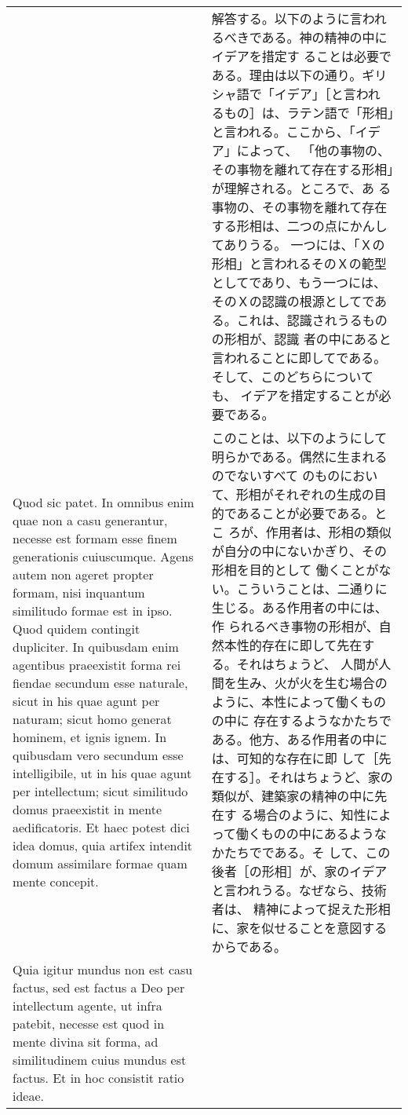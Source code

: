 \documentclass[10pt]{jsarticle} %
\begin{document}
\begin{longtable}{p{21em}p{21em}}
&

解答する。以下のように言われるべきである。神の精神の中にイデアを措定す
ることは必要である。理由は以下の通り。ギリシャ語で「イデア」［と言われ
るもの］は、ラテン語で「形相」と言われる。ここから、「イデア」によって、
「他の事物の、その事物を離れて存在する形相」が理解される。ところで、あ
る事物の、その事物を離れて存在する形相は、二つの点にかんしてありうる。
一つには、「Ｘの形相」と言われるそのＸの範型としてであり、もう一つには、
そのＸの認識の根源としてである。これは、認識されうるものの形相が、認識
者の中にあると言われることに即してである。そして、このどちらについても、
イデアを措定することが必要である。

\\


Quod sic patet. In omnibus enim quae non a casu generantur, necesse
est formam esse finem generationis cuiuscumque. Agens autem non ageret
propter formam, nisi inquantum similitudo formae est in ipso. Quod
quidem contingit dupliciter. In quibusdam enim agentibus praeexistit
forma rei fiendae secundum esse naturale, sicut in his quae agunt per
naturam; sicut homo generat hominem, et ignis ignem. In quibusdam vero
secundum esse intelligibile, ut in his quae agunt per intellectum;
sicut similitudo domus praeexistit in mente aedificatoris. Et haec
potest dici idea domus, quia artifex intendit domum assimilare formae
quam mente concepit.

&

このことは、以下のようにして明らかである。偶然に生まれるのでないすべて
のものにおいて、形相がそれぞれの生成の目的であることが必要である。とこ
ろが、作用者は、形相の類似が自分の中にないかぎり、その形相を目的として
働くことがない。こういうことは、二通りに生じる。ある作用者の中には、作
られるべき事物の形相が、自然本性的存在に即して先在する。それはちょうど、
人間が人間を生み、火が火を生む場合のように、本性によって働くものの中に
存在するようなかたちである。他方、ある作用者の中には、可知的な存在に即
して［先在する］。それはちょうど、家の類似が、建築家の精神の中に先在す
る場合のように、知性によって働くものの中にあるようなかたちでである。そ
して、この後者［の形相］が、家のイデアと言われうる。なぜなら、技術者は、
精神によって捉えた形相に、家を似せることを意図するからである。


\\


Quia igitur mundus non est casu factus, sed est factus a Deo per
intellectum agente, ut infra patebit, necesse est quod in mente divina
sit forma, ad similitudinem cuius mundus est factus. Et in hoc
consistit ratio ideae.


\end{longtable}
\end{document}
